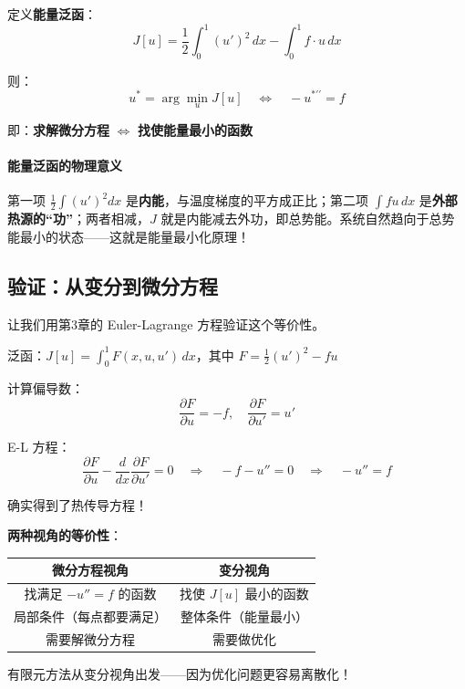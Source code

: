 \begin{keytheorem}[title=能量原理]
定义\textbf{能量泛函}：
\begin{equation}
J[u] = \frac{1}{2}\int_0^1 (u')^2 \, dx - \int_0^1 f \cdot u \, dx
\end{equation}

则：
\begin{equation}
u^* = \arg\min_u J[u] \quad \Longleftrightarrow \quad -u^{*\prime\prime} = f
\end{equation}

即：\textbf{求解微分方程} $\Leftrightarrow$ \textbf{找使能量最小的函数}
\end{keytheorem}

\paragraph{能量泛函的物理意义}

第一项 $\frac{1}{2}\int (u')^2 dx$ 是\textbf{内能}，与温度梯度的平方成正比；第二项 $\int fu \, dx$ 是\textbf{外部热源的“功”}；两者相减，$J$ 就是内能减去外功，即总势能。系统自然趋向于总势能最小的状态——这就是能量最小化原理！

\subsection{验证：从变分到微分方程}

让我们用第3章的 Euler-Lagrange 方程验证这个等价性。

泛函：$J[u] = \int_0^1 F(x, u, u') \, dx$，其中 $F = \frac{1}{2}(u')^2 - fu$

计算偏导数：
\[
\frac{\partial F}{\partial u} = -f, \quad \frac{\partial F}{\partial u'} = u'
\]

E-L 方程：
\[
\frac{\partial F}{\partial u} - \frac{d}{dx}\frac{\partial F}{\partial u'} = 0 \quad \Rightarrow \quad -f - u'' = 0 \quad \Rightarrow \quad -u'' = f
\]

确实得到了热传导方程！

\begin{insightbox}
\textbf{两种视角的等价性}：

\begin{center}
\begin{tabular}{c|c}
\textbf{微分方程视角} & \textbf{变分视角} \\
\hline
找满足 $-u'' = f$ 的函数 & 找使 $J[u]$ 最小的函数 \\
\hline
局部条件（每点都要满足） & 整体条件（能量最小） \\
\hline
需要解微分方程 & 需要做优化 \\
\end{tabular}
\end{center}

有限元方法从变分视角出发——因为优化问题更容易离散化！
\end{insightbox}

